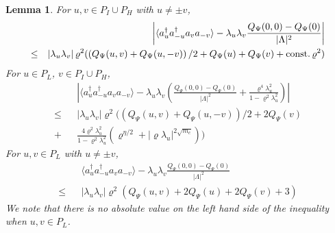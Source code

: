 \documentclass[11pt]{article}
\numberwithin{equation}{section}
\newcommand{\beqa}{\begin{eqnarray}}
\newcommand{\eeqa}{\end{eqnarray}}
\newcommand\const{{\rm const.\, }}
\renewcommand\rho\varrho
\newtheorem{lem}{Lemma}[section]
\theoremstyle{definition}
\begin{document}
\begin{lem}\label{u-uv-vPsi}
For $u,v\in P_I\cup P_H$ with $u\neq\pm v$,
\beqa\label{u-uv-vPMH}
&&\left|\langle a_u^\dagger a_{-u}^\dagger a_va_{-v}\rangle-\lambda_u\lambda_v\frac{Q_\Psi(0,0)-Q_\Psi(0)}{|\Lambda|^2}\right|\\\nonumber
\leq &&\left|\lambda_u\lambda_v\right|\rho^2(\left(Q_\Psi(u,v)+Q_\Psi(u,-v)\right)/2+Q_\Psi(u)+Q_\Psi(v)+\const\rho^2)
\eeqa 
 For $u\in P_L$, $v\in P_I\cup P_H$,
\beqa\label{u-uv-vPLMH}
&&\left|\langle a_u^\dagger a_{-u}^\dagger a_va_{-v}\rangle-\lambda_u\lambda_v\left(\frac{Q_\Psi(0,0)-Q_\Psi(0)}{|\Lambda|^2}+\frac{\rho^4\lambda_u^2}{1-\rho^2\lambda_u^2}\right)\right|\\\nonumber
\leq &&\left|\lambda_u\lambda_v\right|\rho^2\big(\left(Q_\Psi(u,v)+Q_\Psi(u,-v)\right)/2+2Q_\Psi(v)\\\nonumber
+&&\frac{4\rho^2\lambda_u^2}{1-\rho^2\lambda_u^2}(\rho^{\eta/2}+|\rho\lambda_u|^{2\sqrt{m_c}})\big)
\eeqa
 For $u,v\in P_L$ with $u\neq\pm v$,
\beqa\label{u-uv-vPL}
&&\langle a_u^\dagger a_{-u}^\dagger a_va_{-v}\rangle-\lambda_u\lambda_v\frac{Q_\Psi(0,0)-Q_\Psi(0)}{|\Lambda|^2}\\\nonumber
\leq &&\left|\lambda_u\lambda_v\right|\rho^2\left(Q_\Psi(u,v)+2Q_\Psi(u)+2Q_\Psi(v)+3\right)
\eeqa
We note that there is no absolute value on the left hand side  of  the inequality  when $u,v\in P_L$.
\end{lem}
\end{document}
